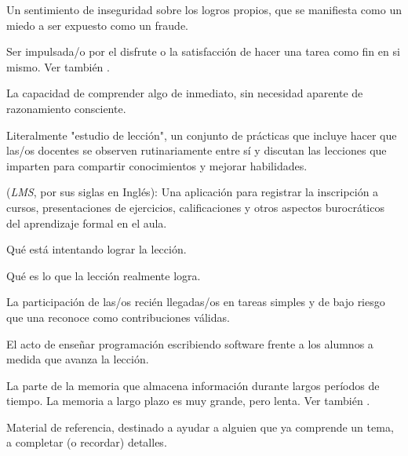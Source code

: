 \begin{description}
 Un sentimiento de inseguridad sobre 
los logros propios, que se manifiesta como un miedo a ser expuesto como un fraude.









 Ser impulsada/o por el disfrute o 
la satisfacción de hacer una tarea como fin en si mismo.  Ver también
.

 La capacidad de comprender algo de inmediato, 
sin necesidad aparente de razonamiento consciente.

 Literalmente "estudio de lección", un conjunto de prácticas que incluye hacer que las/os docentes se observen rutinariamente entre sí y discutan las lecciones que imparten para compartir conocimientos y mejorar habilidades.





 (\emph{LMS}, por sus siglas en Inglés): Una aplicación para registrar la inscripción a cursos, presentaciones de ejercicios, calificaciones y otros aspectos burocráticos del aprendizaje formal en el aula.

 Qué está intentando lograr la lección.

 Qué es lo que la lección realmente logra.

 La participación de las/os recién llegadas/os en tareas simples y de bajo riesgo que una  
 reconoce como contribuciones válidas.

 El acto de enseñar programación 
escribiendo software frente a los alumnos a medida que avanza la lección.

 La parte de la memoria que 
almacena información durante largos períodos de tiempo. La memoria a largo plazo es muy grande, 
pero lenta. Ver también .

 Material de referencia, destinado a ayudar a alguien que ya comprende un tema, a completar (o recordar) detalles.


\end{description}
